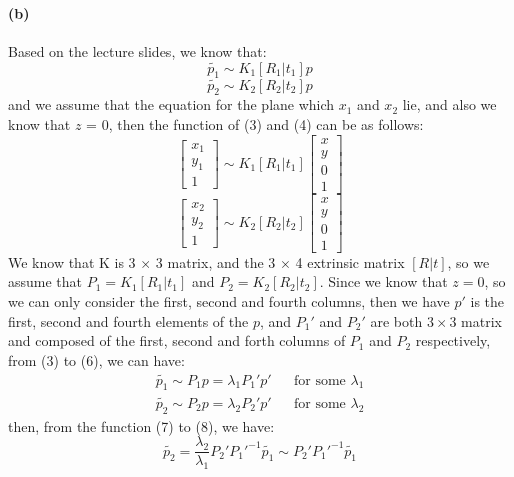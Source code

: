 \documentclass{article}
\newcommand{\spart}[1]{\paragraph{(#1)}}
\begin{document}
\spart{b} Based on the lecture slides, we know that:
\begin{equation}
\tilde{p_1} \sim K_1 [R_1 | t_1] p
\end{equation}
\begin{equation}
\tilde{p_2} \sim K_2 [R_2 | t_2] p
\end{equation}
and we assume that the equation for the plane which $x_1$ and $x_2$ lie, and also we know that $z$ = 0, then the function of (3) and (4) can be as follows:
\begin{equation}
 \left[
   \begin{array}{c}
     x_1\\y_1\\1
   \end{array}
 \right]
 \sim
 K_1 [R_1 | t_1]
 \left[
   \begin{array}{c}
      x\\y\\0\\1
   \end{array}
 \right]
\end{equation}
\begin{equation}
 \left[
   \begin{array}{c}
     x_2\\y_2\\1
   \end{array}
 \right]
 \sim
 K_2 [R_2 | t_2]
 \left[
   \begin{array}{c}
      x\\y\\0\\1
   \end{array}
 \right]
\end{equation}
We know that K is 3 $\times$ 3 matrix, and the 3 $\times$ 4 extrinsic matrix $[R|t]$, so we assume that $P_1 = K_1[R_1|t_1]$ and $P_2 = K_2[R_2|t_2]$. Since we know that $z = 0$, so we can only consider the first, second and fourth columns, then we have $p'$ is the first, second and fourth elements of the $p$, and $P_1'$ and $P_2'$ are both $3 \times 3$ matrix and composed of the first, second and forth columns of $P_1$ and $P_2$ respectively, from (3) to (6), we can have:
\begin{align}
\tilde{p_1} \sim P_1p = \lambda_1P_1'p' && \text{for some $\lambda_1$}
\end{align}
\begin{align}
\tilde{p_2} \sim P_2p = \lambda_2P_2'p' && \text{for some $\lambda_2$}
\end{align}
then, from the function (7) to (8), we have:
\begin{equation}
\tilde{p_2} = \frac{\lambda_2}{\lambda_1}P_2'P_1'^{-1}\tilde{p_1} \sim P_2'P_1'^{-1}\tilde{p_1}
\end{equation}
\end{document}
